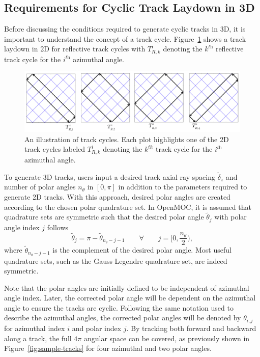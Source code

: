 \subsection{Requirements for Cyclic Track Laydown in 3D}

Before discussing the conditions required to generate cyclic tracks in 3D, it is important to understand the concept of a track cycle. Figure~\ref{fig:tracks-cycles-2D} shows a track laydown in 2D for reflective track cycles with $T_{R,k}^{i}$ denoting the $k^{\textit{th}}$ reflective track cycle for the $i^{\textit{th}}$ azimuthal angle. 

\begin{figure}[h]
	\centering
	\includegraphics[width=6.5in]{figures/laydown/reflective-track-cycles-3.png}
	\caption{An illustration of track cycles. Each plot highlights one of the 2D track cycles labeled $T_{R,k}^{i}$ denoting the $k^{th}$ track cycle for the $i^{\textit{th}}$ azimuthal angle.}
	\label{fig:tracks-cycles-2D}
\end{figure}


To generate 3D tracks, users input a desired track axial ray spacing $\tilde{\delta}_z$ and number of polar angles $n_{\theta}$ in $[0, \pi]$ in addition to the parameters required to generate 2D tracks. With this approach, desired polar angles are created according to the chosen polar quadrature set. In OpenMOC, it is assumed that quadrature sets are symmetric such that the desired polar angle $\tilde{\theta}_{j}$ with polar angle index $j$ follows
\begin{equation}
\tilde{\theta}_{j} = \pi - \tilde{\theta}_{n_{\theta} - j - 1} \qquad \forall \qquad j= \Big[0,\frac{n_{\theta}}{2}\Big),
\end{equation} 
where $\tilde{\theta}_{n_{\theta} - j - 1}$ is the complement of the desired polar angle. Most useful quadrature sets, such as the Gauss Legendre quadrature set, are indeed symmetric. 

Note that the polar angles are initially defined to be independent of azimuthal angle index. Later, the corrected polar angle will be dependent on the azimuthal angle to ensure the tracks are cyclic. Following the same notation used to describe the azimuthal angles, the corrected polar angles will be denoted by $\theta_{i,j}$ for azimuthal index $i$ and polar index $j$. By tracking both forward and backward along a track, the full $4 \pi$ angular space can be covered, as previously shown in Figure~\ref{fig:sample-tracks} for four azimuthal and two polar angles.

